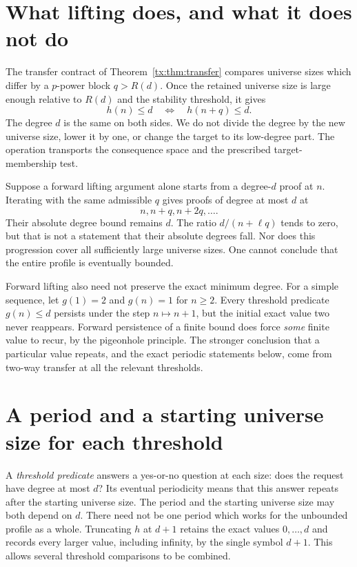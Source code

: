 \documentclass[11pt,a4paper,oneside,openany]{book}
\theoremstyle{definition}\newtheorem{definition}[theorem]{Definition}
\theoremstyle{remark}\newtheorem{remark}[theorem]{Remark}
\numberwithin{equation}{chapter}
\begin{document}
\section{What lifting does, and what it does not do}
The transfer contract of Theorem~\ref{tx:thm:transfer} compares universe sizes
which differ by a $p$-power block $q>R(d)$. Once the retained universe size is
large enough relative to $R(d)$ and the stability threshold, it gives
\[
                         h(n)\le d\quad\Longleftrightarrow\quad
                         h(n+q)\le d.
\]
The degree $d$ is the same on both sides. We do not divide the degree
by the new universe size, lower it by one, or change the target to
its low-degree part. The operation transports the consequence space
and the prescribed target-membership test.

Suppose a forward lifting argument alone starts from a degree-$d$
proof at $n$. Iterating with the same admissible $q$ gives proofs of
degree at most $d$ at
\[
                            n,n+q,n+2q,\ldots.
\]
Their absolute degree bound remains $d$. The ratio $d/(n+\ell q)$
tends to zero, but that is not a statement that their absolute degrees
fall. Nor does this progression cover all sufficiently large universe sizes.
One cannot conclude that the entire profile is eventually bounded.

Forward lifting also need not preserve the exact minimum degree.
For a simple sequence, let $g(1)=2$ and $g(n)=1$ for $n\ge2$.
Every threshold predicate $g(n)\le d$ persists under the step $n\mapsto
n+1$, but the initial exact value two never reappears. Forward
persistence of a finite bound does force \emph{some} finite value to
recur, by the pigeonhole principle. The stronger conclusion that a
particular value repeats, and the exact periodic statements below,
come from two-way transfer at all the relevant thresholds.

\section{A period and a starting universe size for each threshold}
A \emph{threshold predicate} answers a yes-or-no question at each
size: does the request have degree at most $d$? Its eventual
periodicity means that this answer repeats after the starting universe size.
The period and the starting universe size may both depend on $d$.
There need not be one period which works for the unbounded profile
as a whole.
Truncating $h$ at $d+1$ retains the exact values $0,\ldots,d$ and
records every larger value, including infinity, by the single symbol
$d+1$. This allows several threshold comparisons to be combined.
\end{document}
